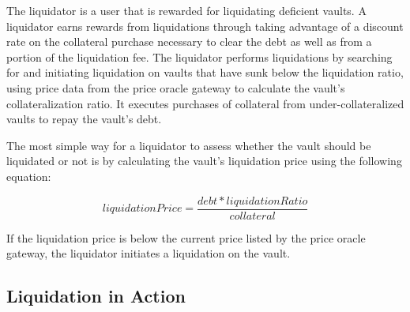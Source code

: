 \documentclass[12pt]{article}
\begin{document}
The liquidator is a user that is rewarded for liquidating deficient vaults. A liquidator earns rewards from liquidations through taking advantage of a discount rate on the collateral purchase necessary to clear the debt as well as from a portion of the liquidation fee.  The liquidator performs liquidations by searching for and initiating liquidation on vaults that have sunk below the liquidation ratio, using price data from the price oracle gateway to calculate the vault's collateralization ratio. It executes purchases of collateral from under-collateralized vaults to repay the vault's debt.

The most simple way for a liquidator to assess whether the vault should be liquidated or not is by calculating the vault's liquidation price using the following equation:

\begin{equation*}
	liquidationPrice = \frac{debt * liquidationRatio}{collateral}
\end{equation*}

If the liquidation price is below the current price listed by the price oracle gateway, the liquidator initiates a liquidation on the vault.

\subsection{Liquidation in Action}
\end{document}
